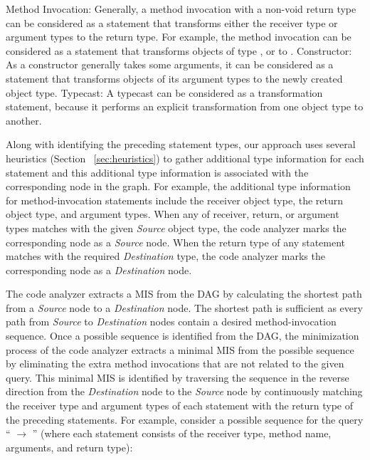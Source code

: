 \begin{Itemize}
\Item Method Invocation: Generally, a method invocation with a
non-void return type can be considered as a statement that
transforms either the receiver type  or argument types to the return type. For example, the
method invocation  can be considered as a statement that transforms objects of
type ,  or  to
.
%
\Item Constructor: As a constructor generally takes some arguments,
it can be considered as a statement that transforms objects of its
argument types to the newly created object type.
%
\Item Typecast: A typecast can be considered as a transformation
statement, because it performs an explicit transformation from one
object type to another.
\end{Itemize}

Along with identifying the preceding statement types, our
approach uses several heuristics (Section ~\ref{sec:heuristics}) to
gather additional type information for each statement and this
additional type information is associated with the corresponding
node in the graph. For example, the additional type information for
method-invocation statements include the receiver object type, the
return object type, and argument types. When any of receiver, return,
or argument types matches with the given \emph{Source} object type,
the code analyzer marks the corresponding node as a \emph{Source}
node. When the return type of any statement matches with the
required \emph{Destination} type, the code analyzer marks the
corresponding node as a \emph{Destination} node.

The code analyzer extracts a MIS from the DAG by calculating the
shortest path from a \emph{Source} node to a \emph{Destination}
node. The shortest path is sufficient as every path from
\emph{Source} to \emph{Destination} nodes contain a desired
method-invocation sequence. Once a possible sequence is identified
from the DAG, the minimization process of the code analyzer extracts
a minimal MIS from the possible sequence by eliminating the extra
method invocations that are not related to the given query. This
minimal MIS is identified by traversing the sequence in the reverse
direction from the \emph{Destination} node to the \emph{Source} node
by continuously matching the receiver type and argument types of
each statement with the return type of the preceding statements. For
example, consider a possible sequence for the query
`` $\rightarrow$ ''
(where each statement consists of the receiver type, method
name, arguments, and return type):

